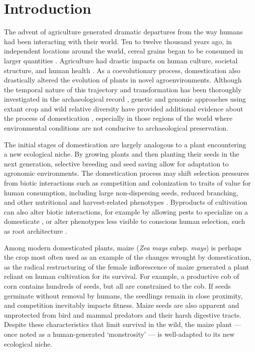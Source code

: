 \documentclass[a4paper]{article}
\begin{document}
\section*{Introduction}

﻿The advent of agriculture generated dramatic departures from the way humans had been interacting with their world.
Ten to twelve thousand years ago, in independent locations around the world, cereal grains began to be consumed in larger quantities \citep{larson2014}.
Agriculture had drastic impacts on human culture, societal structure, and human health \citep{larsen2006}.
As a coevolutionary process, domestication also drastically altered the evolution of plants in novel agroenvironments.
Although the temporal nature of this trajectory and transformation has been thoroughly investigated in the archaeological record \citep{smith2001}, genetic and genomic approaches using extant crop and wild relative diversity have provided additional evidence about the process of domestication \citep{zeder2006}, especially in those regions of the world where environmental conditions are not conducive to archaeological preservation.

﻿The initial stages of domestication are largely analogous to a plant encountering a new ecological niche.
﻿By growing plants and then planting their seeds in the next generation, selective breeding and seed saving allow for adaptation to agronomic environments.
﻿The domestication process may shift selection pressures from biotic interactions such as competition and colonization to traits of value for human consumption, including large non-dispersing seeds, reduced branching, and other nutritional and harvest-related phenotypes \citep{doebley2006}.
Byproducts of cultivation can also alter biotic interactions, for example by allowing pests to specialize on a domesticate \citep{bernal2018, gaillard2018}, or alter phenotypes less visible to conscious human selection, such as root architecture \citep{burton2013}.

﻿Among modern domesticated plants, maize (\textit{Zea mays} subsp. \textit{mays}) is perhaps the crop most often used as an example of the changes wrought by domestication, as the radical restructuring of the female inflorescence of maize generated a plant reliant on human cultivation for its survival.
﻿For example, a productive cob of corn contains hundreds of seeds, but all are constrained to the cob.
If seeds germinate without removal by humans, the seedlings remain in close proximity, and competition inevitably impacts fitness.
﻿Maize seeds are also apparent and unprotected from bird and mammal predators and their harsh digestive tracts.
Despite these characteristics that limit survival in the wild, the maize plant --- once noted as a human-generated `monstrosity' \citep{beadle1972} --- is well-adapted to its new ecological niche.
\end{document}
